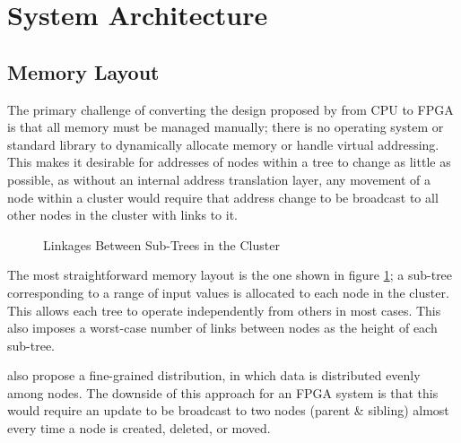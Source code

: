 \section{System Architecture}

\subsection{Memory Layout}

The primary challenge of converting the design proposed by \citeauthor{base} from CPU to FPGA is that all memory must be managed manually; there is no operating system or standard library to dynamically allocate memory or handle virtual addressing. This makes it desirable for addresses of nodes within a tree to change as little as possible, as without an internal address translation layer, any movement of a node within a cluster would require that address change to be broadcast to all other nodes in the cluster with links to it.

\newcommand{\clusternode}[1]{
	\draw ({(#1)*6}, 0) ++(-2.75, 0.5) rectangle ++(5.5, -3);
	\node[tree] at ({(#1)*6}, 0) (n#1 00) {};
	\foreach \r [
		evaluate = \r as \w using int(3^\r),
		evaluate = \r as \wl using int(3^\r-1)
	] in {1,...,2} {
		\foreach \c [
			evaluate = \c as \i using int((\w-1)/2 + \c-1),
			evaluate = \c as \pr using int(\r-1),
			evaluate = \c as \pc using int(\c/3),
			evaluate = \c as \cl using int(\c-1)
		] in {0,...,\wl} {
			\node[tree] (n#1 \r\c)
				at ({(#1)*6 + (\c-int(\w/2)) / (\w/5)}, -\r) {};
			\draw[->] (n#1 \pr\pc) -- (n#1 \r\c);
			\ifthenelse{\c=0}{}{
				\draw[->] (n#1 \r\cl) -- (n#1 \r\c);
			}
		}
	}
}

\begin{figure}
	\centering
	\caption{Linkages Between Sub-Trees in the Cluster}
\label{coarse-link}
\end{figure}

The most straightforward memory layout is the one shown in figure \ref{coarse-link}; a sub-tree corresponding to a range of input values is allocated to each node in the cluster. This allows each tree to operate independently from others in most cases. This also imposes a worst-case number of links between nodes as the height of each sub-tree.

\citeauthor{base} also propose a fine-grained distribution, in which data is distributed evenly among nodes. The downside of this approach for an FPGA system is that this would require an update to be broadcast to two nodes (parent \& sibling) almost every time a node is created, deleted, or moved.
